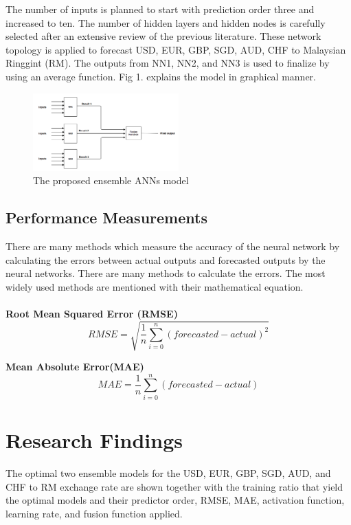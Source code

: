 \documentclass[journal]{IEEEtran}
\begin{document}
The number of inputs is planned to start with prediction order three and increased to ten. The number of hidden layers and hidden nodes is carefully selected  after an extensive review of the previous literature. These network topology is applied to forecast  USD, EUR, GBP, SGD, AUD, CHF to Malaysian Ringgint (RM). The outputs from NN1, NN2, and NN3 is used to finalize by using an average function. Fig 1. explains the model in graphical manner.

\begin{figure}[hbt!]\centering
	\includegraphics[width=0.5\textwidth]{ensemblemodel}
	\caption{The proposed ensemble ANNs model}
\end{figure}


\subsection{Performance Measurements}

There are many methods which measure the accuracy of the neural network by calculating the errors between actual outputs and forecasted outputs by the neural networks. There are many methods to calculate the errors. The most widely used methods are mentioned with their mathematical equation.
\\
\\
\textbf{Root Mean Squared Error (RMSE)}\\
\begin{equation*}
	RMSE= \sqrt{\frac {1}{n}\sum_{i=0}^n(forecasted -  actual )^2} 
\end{equation*}

\textbf{Mean Absolute Error(MAE)}\\
\begin{equation*}
	MAE= \frac {1}{n} \sum_{i=0}^n (forecasted - actual)
\end{equation*}

\section{Research Findings}	


The optimal two ensemble models for the USD, EUR, GBP, SGD, AUD, and CHF to RM exchange rate are shown together with the training ratio that yield the optimal models and their predictor order, RMSE, MAE, activation function, learning rate, and fusion function applied.
\end{document}
